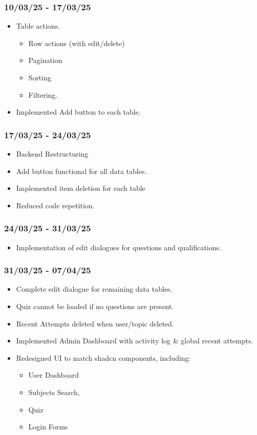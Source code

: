 \documentclass[]{final_report}
\begin{document}
\subsubsection*{10/03/25 - 17/03/25}
\begin{itemize}
    \item Table actions. 
    \begin{itemize}
        \item Row actions (with edit/delete)
        \item Pagination
        \item Sorting 
        \item Filtering. 
    \end{itemize}
    \item Implemented Add button to each table.
\end{itemize}

\subsubsection*{17/03/25 - 24/03/25}
\begin{itemize}
    \item Backend Restructuring
    \item Add button functional for all data tables. 
    \item Implemented item deletion for each table
    \item Reduced code repetition.
\end{itemize}

\subsubsection*{24/03/25 - 31/03/25}
\begin{itemize}
    \item Implementation of edit dialogues for questions and qualifications. 
\end{itemize}

\subsubsection*{31/03/25 - 07/04/25}
\begin{itemize}
    \item Complete edit dialogue for remaining data tables. 
    \item Quiz cannot be loaded if no questions are present. 
    \item Recent Attempts deleted when user/topic deleted. 
    \item Implemented Admin Dashboard with activity log \& global recent attempts. 
    \item Redesigned UI to match shadcn components, including:
    \begin{itemize}
        \item User Dashboard
        \item Subjects Search,
        \item Quiz
        \item Login Forms
    \end{itemize}
\end{itemize}
\end{document}
